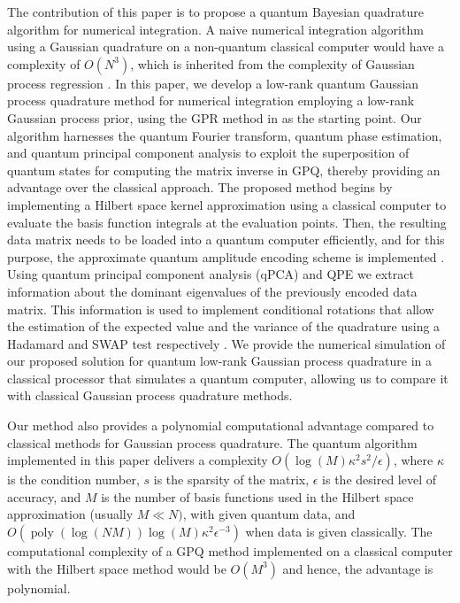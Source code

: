 \documentclass[10pt]{article}
\begin{document}
	The contribution of this paper is to propose a quantum Bayesian quadrature algorithm for numerical integration.  A naive numerical integration algorithm using a Gaussian quadrature on a non-quantum classical computer would have a complexity of $O(N^3)$, which is inherited from the complexity of Gaussian process regression \citep{Rasmussen2006GPforML}. In this paper, we develop a low-rank quantum Gaussian process quadrature method for numerical integration employing a low-rank Gaussian process prior, using the GPR method in \citet{Farooq2024QAHSGPR} as the starting point.
	Our algorithm harnesses the quantum Fourier transform, quantum phase estimation, and quantum principal component analysis to exploit the superposition of quantum states for computing the matrix inverse in GPQ, thereby providing an advantage over the classical approach. The proposed method begins by implementing a Hilbert space kernel approximation \citep{Solin2020HilbertSpaceGPR} using a classical computer to evaluate the basis function integrals at the evaluation points.
	Then, the resulting data matrix needs to be loaded into a quantum computer efficiently, and for this purpose, the approximate quantum amplitude encoding scheme is implemented \citep{Nakaji2022ApproximateAmplitudeEncoding}.
	Using quantum principal component analysis (qPCA) \citep{Lloyd2014QPCA} and QPE we extract information about the dominant eigenvalues of the previously encoded data matrix. 
	This information is used to implement conditional rotations that allow the estimation of the expected value and the variance of the quadrature using a Hadamard and SWAP test respectively \citep{Schuld2021QML, Buhrman2001QFingerprinting}.
	We provide the numerical simulation of our proposed solution for quantum low-rank Gaussian process quadrature in a classical processor that simulates a quantum computer, allowing us to compare it with classical Gaussian process quadrature methods.
	
	Our method also provides a polynomial computational advantage compared to classical methods for Gaussian process quadrature. The quantum algorithm implemented in this paper delivers a complexity $O(\log(M)\kappa^2 s^2/\epsilon)$, where $\kappa$ is the condition number, $s$ is the sparsity of the matrix, $\epsilon$ is the desired level of accuracy, and $M$ is the number of basis functions used in the Hilbert space approximation (usually $M \ll N)$, with given quantum data, and $O(\operatorname{poly}(\log (NM))\log(M) \kappa^2 \epsilon^{-3})$ when data is given classically. The computational complexity of a GPQ method implemented on a classical computer with the Hilbert space method would be $O(M^3)$ and hence, the advantage is polynomial.
	
\end{document}
